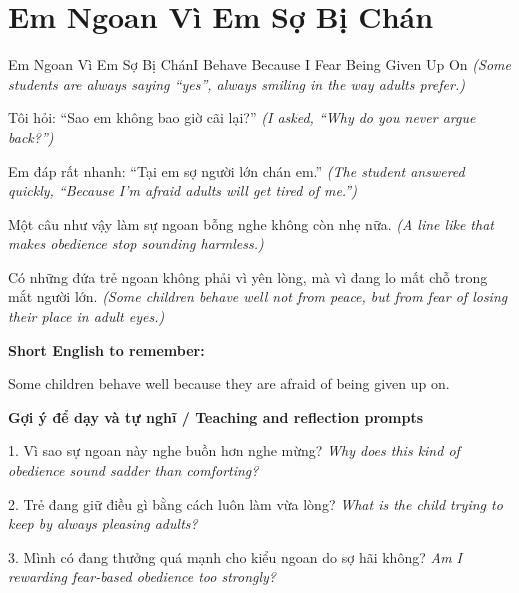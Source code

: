 \section{Em Ngoan Vì Em Sợ Bị Chán}
\begin{truyen}{Em Ngoan Vì Em Sợ Bị Chán}{I Behave Because I Fear Being Given Up On}
\textit{(Some students are always saying “yes”, always smiling in the way adults prefer.)}

Tôi hỏi: “Sao em không bao giờ cãi lại?”
\textit{(I asked, “Why do you never argue back?”)}

Em đáp rất nhanh: “Tại em sợ người lớn chán em.”
\textit{(The student answered quickly, “Because I'm afraid adults will get tired of me.”)}

Một câu như vậy làm sự ngoan bỗng nghe không còn nhẹ nữa.
\textit{(A line like that makes obedience stop sounding harmless.)}

\end{truyen}

\begin{baihoc}
Có những đứa trẻ ngoan không phải vì yên lòng, mà vì đang lo mất chỗ trong mắt người lớn.
\textit{(Some children behave well not from peace, but from fear of losing their place in adult eyes.)}
\end{baihoc}

\begin{ghinhoanh}
\textbf{Short English to remember:}

Some children behave well because they are afraid of being given up on.

\end{ghinhoanh}

\begin{tuhocnhanh}
\textbf{Gợi ý để dạy và tự nghĩ / Teaching and reflection prompts}

1. Vì sao sự ngoan này nghe buồn hơn nghe mừng? \textit{Why does this kind of obedience sound sadder than comforting?}

2. Trẻ đang giữ điều gì bằng cách luôn làm vừa lòng? \textit{What is the child trying to keep by always pleasing adults?}

3. Mình có đang thưởng quá mạnh cho kiểu ngoan do sợ hãi không? \textit{Am I rewarding fear-based obedience too strongly?}
\end{tuhocnhanh}
\ngancach

